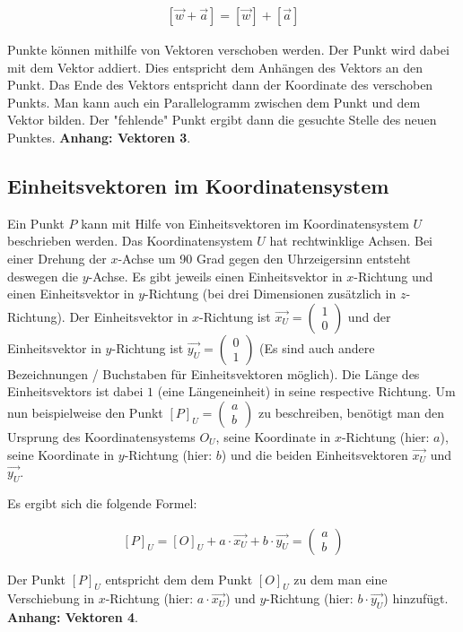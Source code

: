 \documentclass{article}
\newcommand{\m}[1]{\begin{pmatrix}#1\end{pmatrix}}
\begin{document}
    \[
        \begin{split}
            [\vec{w} + \vec{a}] = [\vec{w}] + [\vec{a}]
        \end{split}
    \]

    Punkte können mithilfe von Vektoren verschoben werden. Der Punkt wird dabei mit dem Vektor
    addiert. Dies entspricht dem Anhängen des Vektors an den Punkt. Das Ende des Vektors entspricht dann
    der Koordinate des verschoben Punkts. Man kann auch ein Parallelogramm zwischen dem Punkt und dem
    Vektor bilden. Der "fehlende"
    Punkt ergibt dann die gesuchte Stelle des neuen Punktes. \textbf{Anhang: Vektoren 3}.

    \subsection{Einheitsvektoren im Koordinatensystem}
    Ein Punkt $P$ kann mit Hilfe von Einheitsvektoren im Koordinatensystem $U$ beschrieben werden.
    Das Koordinatensystem $U$ hat rechtwinklige Achsen.
    Bei einer Drehung der $x$-Achse um 90 Grad gegen den Uhrzeigersinn entsteht deswegen die $y$-Achse.
    Es gibt jeweils einen Einheitsvektor in
    $x$-Richtung und einen Einheitsvektor in $y$-Richtung (bei drei Dimensionen zusätzlich in $z$-Richtung).
    Der Einheitsvektor in $x$-Richtung ist $\vec{{x}_{U}} = \m{1 \\ 0}$ und der Einheitsvektor in
    $y$-Richtung ist $\vec{{y}_{U}} = \m{0 \\ 1}$ (Es sind auch andere Bezeichnungen / Buchstaben für Einheitsvektoren
    möglich).
    Die Länge des Einheitsvektors ist dabei $1$
    (eine Längeneinheit)
    in seine respective Richtung. Um nun beispielweise den Punkt
    ${[P]}_{U} = \m{a \\ b}$ zu beschreiben, benötigt man den Ursprung des Koordinatensystems ${O}_{U}$, seine Koordinate in $x$-Richtung (hier: $a$),
    seine Koordinate in $y$-Richtung (hier: $b$) und die beiden Einheitsvektoren $\vec{{x}_{U}}$ und $\vec{{y}_{U}}$.
    
    Es ergibt sich die folgende Formel:

    \[
        \begin{split}
            {[P]}_{U} = {[O]}_{U} + a \cdot \vec{{x}_{U}} + b \cdot \vec{{y}_{U}} = \m{a \\ b}
        \end{split}
    \]

    Der Punkt ${[P]}_{U}$ entspricht dem dem Punkt ${[O]}_{U}$ zu dem man eine Verschiebung in
    $x$-Richtung (hier: $a \cdot \vec{{x}_{U}}$) und $y$-Richtung (hier: $b \cdot \vec{{y}_{U}}$) hinzufügt.
    \textbf{Anhang: Vektoren 4}.
\end{document}
